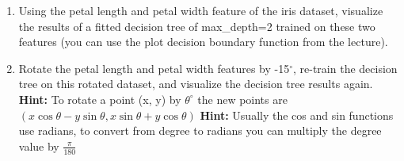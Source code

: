 \documentclass[USenglish,final,authoryear,12pt]{article}
\begin{document}
\begin{enumerate}
	\item Using the petal length and petal width feature of the iris dataset, visualize the results of a fitted decision tree of max\_depth=2 trained on these two features (you can use the plot decision boundary function from the lecture).
	\item Rotate the petal length and petal width features by -15$^\circ$, re-train the decision tree on this rotated dataset, and visualize the decision tree results again.\newline
	\textbf{Hint:} To rotate a point (x, y) by $\theta^\circ$ the new points are $(x\cos\theta - y\sin\theta, x\sin\theta + y\cos\theta)$\newline
	\textbf{Hint:} Usually the cos and sin functions use radians, to convert from degree to radians you can multiply the degree value by $\frac{\pi}{180}$
\end{enumerate}
\end{document}
